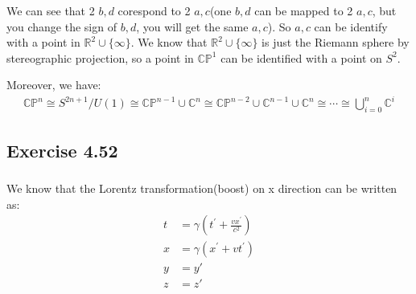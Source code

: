\documentclass[]{ctexart}
\begin{document}
				We can see that 2 $b,d$ corespond to 2 $a,c$(one $b,d$ can be mapped to 2 $a,c$, but you change the sign of $b,d$, you will get the same $a,c$). So $a,c$ can be identify with a point in $\mathbb{R}^2\cup\{\infty\}$. We know that $\mathbb{R}^2\cup\{\infty\}$ is just the Riemann sphere by stereographic projection, so a point in $\mathbb{CP}^1$ can be identified with a point on $S^2$. 
				
				Moreover, we have:
					\begin{equation*}
					\begin{aligned}
						\mathbb{CP}^n\cong S^{2n+1}/U(1)\cong \mathbb{CP}^{n-1}\cup \mathbb{C}^n\cong \mathbb{CP}^{n-2}\cup \mathbb{C}^{n-1}\cup\mathbb {C}^n\cong \cdots \cong \bigcup_{i=0}^{n}\mathbb{C}^i
					\end{aligned}
					\end{equation*}
		
	\subsection{Exercise 4.52}
		\subsubsection{}
			We know that the Lorentz transformation(boost) on x direction can be written as:
				\begin{equation*}
				\begin{aligned}
					t &=\gamma\left(t^{\prime}+\frac{v x^{\prime}}{c^{2}}\right) \\
					x &=\gamma\left(x^{\prime}+v t^{\prime}\right)\\
					y &=y'\\
					z &=z'
				\end{aligned}
				\end{equation*}
			
\end{document}
